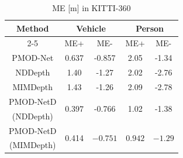 \begin{table}[t]
  \centering
  \caption{ME [m] in KITTI-360}
  \label{result_ME_KITTI-360}
  \begin{tabular}{c|cc|cc}
    \toprule
    \multirow{2}{*}{Method}  & \multicolumn{2}{c}{Vehicle} & \multicolumn{2}{c}{Person} \\ \cmidrule{2-5} 
                                           & ME+            & ME-          & ME+           & ME-         \\ \midrule
    PMOD-Net\cite{3}                             & 0.637         & -0.857         & 2.05         & -1.34        \\ \midrule
    NDDepth\cite{1}                                   & 1.40         & -1.27         & 2.02         & -2.76        \\ \midrule
    MIMDepth\cite{2}                                    & 1.43         & -1.26         & 2.09         & -2.78        \\ \midrule
    PMOD-NetD                                  & \multirow{2}{*}{$\bm{0.397}$}          & \multirow{2}{*}{-0.766}         & \multirow{2}{*}{1.02}          & \multirow{2}{*}{-1.38}        \\ 
    (NDDepth\cite{1})                        &                                  &                                  &                                  &                                 \\ \midrule
    PMOD-NetD                                   & \multirow{2}{*}{0.414}          & \multirow{2}{*}{$\bm{-0.751}$}         & \multirow{2}{*}{$\bm{0.942}$}          & \multirow{2}{*}{$\bm{-1.29}$}        \\
    (MIMDepth\cite{2})&                                  &                                  &                                  &                                 \\ \bottomrule
  \end{tabular}
\end{table}
